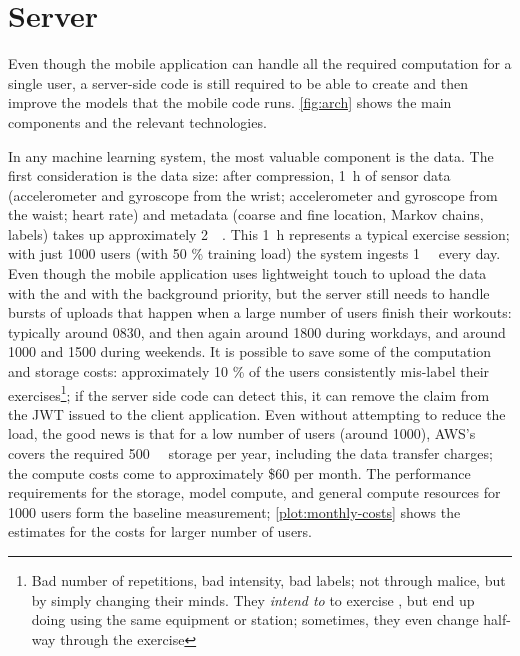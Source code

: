 \section{Server}\label{sec:server}
Even though the mobile application can handle all the required computation for a single user, a server-side code is still required to be able to create and then improve the models that the mobile code runs. \autoref{fig:arch} shows the main components and the relevant technologies.


In any machine learning system, the most valuable component is the data. The first consideration is the data size: after compression, \SI{1}{\hour} of sensor data (accelerometer and gyroscope from the wrist; accelerometer and gyroscope from the waist; heart rate) and metadata (coarse and fine location, Markov chains, labels) takes up approximately \SI{2}{\mebi\byte}. This \SI{1}{\hour} represents a typical exercise session; with just 1000 users (with 50 \% training load) the system ingests \SI{1}{\gibi\byte} every day. Even though the mobile application uses lightweight touch to upload the data with the  and  with the background priority, but the server still needs to handle bursts of uploads that happen when a large number of users finish their workouts: typically around 0830, and then again around 1800 during workdays, and around 1000 and 1500 during weekends. It is possible to save some of the computation and storage costs: approximately 10 \% of the users consistently mis-label their exercises\footnote{Bad number of repetitions, bad intensity, bad labels; not through malice, but by simply changing their minds. They \emph{intend to} to exercise , but end up doing  using the same equipment or station; sometimes, they even change half-way through the exercise}; if the server side code can detect this, it can remove the  claim from the JWT issued to the client application. Even without attempting to reduce the load, the good news is that for a low number of users (around 1000), AWS's  covers the required \SI{500}{\gibi\byte} storage per year, including the data transfer charges; the compute costs come to approximately \$60 per month. The performance requirements for the storage, model compute, and general compute resources for 1000 users form the baseline measurement; \autoref{plot:monthly-costs} shows the estimates for the costs for larger number of users. 

